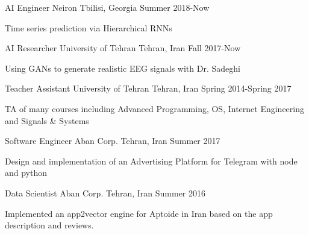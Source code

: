 

\begin{cventries}

 \cventry
    {AI Engineer} %
    {Neiron} %
    {Tbilisi, Georgia} %
    {Summer 2018-Now} %
    {
      \begin{cvitems} %
        \item {Time series prediction via Hierarchical RNNs}
      \end{cvitems}
    }

 \cventry
    {AI Researcher} %
    {University of Tehran} %
    {Tehran, Iran} %
    {Fall 2017-Now} %
    {
      \begin{cvitems} %
        \item {Using GANs to generate realistic EEG signals with Dr. Sadeghi}
      \end{cvitems}
    }

 \cventry
    {Teacher Assistant} %
    {University of Tehran} %
    {Tehran, Iran} %
    {Spring 2014-Spring 2017} %
    {
      \begin{cvitems} %
        \item {TA of many courses including Advanced Programming, OS, Internet Engineering and Signals \& Systems}
      \end{cvitems}
    }

 \cventry
    {Software Engineer} %
    {Aban Corp.} %
    {Tehran, Iran} %
    {Summer 2017} %
    {
      \begin{cvitems} %
        \item {Design and implementation of an Advertising Platform for Telegram with node and python}
      \end{cvitems}
    }


  \cventry
    {Data Scientist} %
    {Aban Corp.} %
    {Tehran, Iran} %
    {Summer 2016} %
    {
      \begin{cvitems} %
        \item {Implemented an app2vector engine for Aptoide in Iran based on the app description and reviews.}
      \end{cvitems}
    }


\end{cventries}
